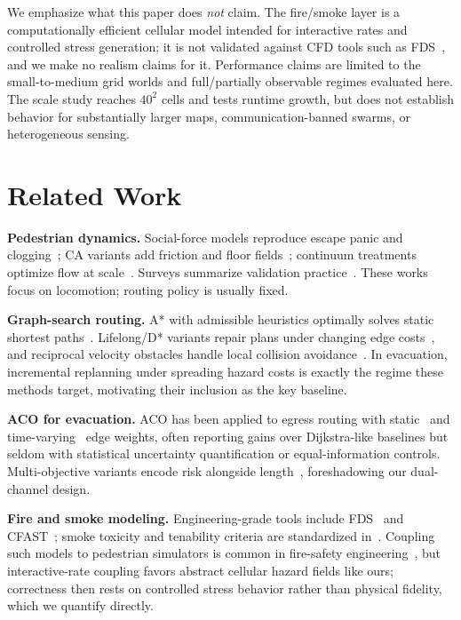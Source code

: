 ﻿\documentclass[conference]{IEEEtran}
\begin{document}
We emphasize what this paper does \emph{not} claim. The fire/smoke layer is a computationally efficient cellular model intended for interactive rates and controlled stress generation; it is not validated against CFD tools such as FDS~\cite{mcgrattan2021fds}, and we make no realism claims for it. Performance claims are limited to the small-to-medium grid worlds and full/partially observable regimes evaluated here. The scale study reaches $40^2$ cells and tests runtime growth, but does not establish behavior for substantially larger maps, communication-banned swarms, or heterogeneous sensing.

\section{Related Work}
\textbf{Pedestrian dynamics.} Social-force models reproduce escape panic and clogging~\cite{helbing2000}; CA variants add friction and floor fields~\cite{kirchner2002,burstedde2001,muramatsu1999}; continuum treatments optimize flow at scale~\cite{treuille2006}. Surveys summarize validation practice~\cite{zheng2009}. These works focus on locomotion; routing policy is usually fixed.

\textbf{Graph-search routing.} A* with admissible heuristics optimally solves static shortest paths~\cite{hart1968}. Lifelong/D* variants repair plans under changing edge costs~\cite{koenig2002,stentz1994}, and reciprocal velocity obstacles handle local collision avoidance~\cite{vandenbergen2011}. In evacuation, incremental replanning under spreading hazard costs is exactly the regime these methods target, motivating their inclusion as the key baseline.

\textbf{ACO for evacuation.} ACO has been applied to egress routing with static~\cite{liu2016aco,yanuary2023aco} and time-varying~\cite{wang2020dynamicaco} edge weights, often reporting gains over Dijkstra-like baselines but seldom with statistical uncertainty quantification or equal-information controls. Multi-objective variants encode risk alongside length~\cite{duan2020multiaco}, foreshadowing our dual-channel design.

\textbf{Fire and smoke modeling.} Engineering-grade tools include FDS~\cite{mcgrattan2021fds} and CFAST~\cite{peacock2011cfast}; smoke toxicity and tenability criteria are standardized in~\cite{purser2017sfpe}. Coupling such models to pedestrian simulators is common in fire-safety engineering~\cite{kuligowski2005review}, but interactive-rate coupling favors abstract cellular hazard fields like ours; correctness then rests on controlled stress behavior rather than physical fidelity, which we quantify directly.
\end{document}
